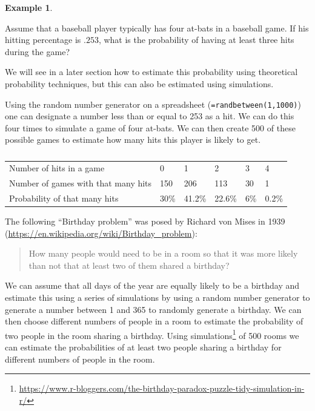 \documentclass[
]{book}
\theoremstyle{definition}
\theoremstyle{definition}
\newtheorem{example}{Example}[chapter]
\theoremstyle{definition}
\theoremstyle{definition}
\theoremstyle{remark}
\begin{document}
\begin{example}
\protect\hypertarget{exm:unlabeled-div-304}{}\label{exm:unlabeled-div-304}

Assume that a baseball player typically has four at-bats in a baseball game. If his hitting percentage is \(.253\), what is the probability of having at least three hits during the game?

We will see in a later section how to estimate this probability using theoretical probability techniques, but this can also be estimated using simulations.

Using the random number generator on a spreadsheet (\texttt{=randbetween(1,1000)}) one can designate a number less than or equal to 253 as a hit. We can do this four times to simulate a game of four at-bats. We can then create 500 of these possible games to estimate how many hits this player is likely to get.

\begin{table}

\caption{\label{tab:unnamed-chunk-226}}
\centering
\begin{tabular}[t]{llllll}
\toprule
  &  &  &  &  & \\
\midrule
Number of hits in a game & 0 & 1 & 2 & 3 & 4\\
Number of games with that many hits & 150 & 206 & 113 & 30 & 1\\
Probability of that many hits & 30\% & 41.2\% & 22.6\% & 6\% & 0.2\%\\
\bottomrule
\end{tabular}
\end{table}

\end{example}

The following ``Birthday problem'' was posed by Richard von Mises in 1939 (\url{https://en.wikipedia.org/wiki/Birthday_problem}):

\begin{quote}
How many people would need to be in a room so that it was more likely than not that at least two of them shared a birthday?
\end{quote}

We can assume that all days of the year are equally likely to be a birthday and estimate this using a series of simulations by using a random number generator to generate a number between 1 and 365 to randomly generate a birthday. We can then choose different numbers of people in a room to estimate the probability of two people in the room sharing a birthday. Using simulations\footnote{\url{https://www.r-bloggers.com/the-birthday-paradox-puzzle-tidy-simulation-in-r/}} of 500 rooms we can estimate the probabilities of at least two people sharing a birthday for different numbers of people in the room.
\end{document}
